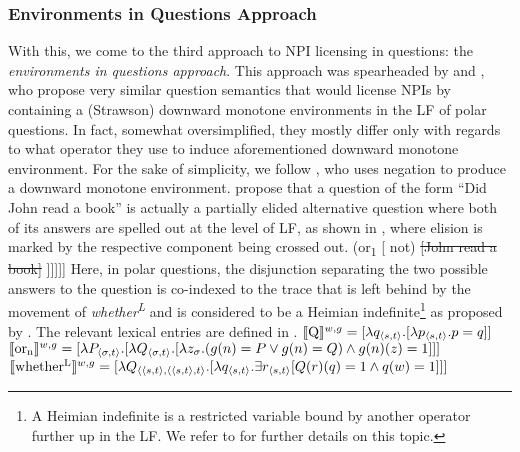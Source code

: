 \subsubsection{Environments in Questions Approach}
With this, we come to the third approach to NPI licensing in questions: the \textit{environments in questions approach}. This approach was spearheaded by \textcite{Guerzoni2014-enviro} and \textcite{Nicolae2013}, who propose very similar question semantics that would license NPIs by containing a (Strawson) downward monotone environments in the LF of polar questions. In fact, somewhat oversimplified, they mostly differ only with regards to what operator they use to induce aforementioned downward monotone environment. For the sake of simplicity, we follow \textcite{Guerzoni2014-enviro}, who uses negation to produce a downward monotone environment. \textcite{Guerzoni2014-enviro} propose that a question of the form \enquote{Did John read a book} is actually a partially elided alternative question where both of its answers are spelled out at the level of LF, as shown in , where elision is marked by the respective component being crossed out.
\ex\phantomsection
[] [whether\textsuperscript{L} [ 1 [ Q [ [John read a book] (or\textsubscript{1} [ not) \sout{[John read a book]} ]\hspace{0.5mm}]\hspace{0.5mm}]\hspace{0.5mm}]\hspace{0.5mm}]
\xe
Here, in polar questions, the disjunction separating the two possible answers to the question is co-indexed to the trace that is left behind by the movement of \textit{whether\textsuperscript{L}} and is considered to be a Heimian indefinite\footnote{A Heimian indefinite is a restricted variable bound by another operator further up in the LF. We refer to \textcite{Heim1982} for further details on this topic.} as proposed by \textcite{Rooth1982}. The relevant lexical entries are defined in .
\pex[nopreamble=true]\label{ex:gs-definitions}%
\a{} $\intension[w,g]{Q}=[\lambda{q_{\langle s,t\rangle}}.[\lambda{p_{\langle s,t\rangle}}.p=q]]$
\a{} $\intension[w,g]{or\textsubscript{n}}=[\lambda{P_{\langle\sigma,t\rangle}}.[\lambda{Q_{\langle\sigma,t\rangle}}.[\lambda{z_{\sigma}}.(g(n)=P\lor g(n)=Q)\land g(n)(z)=1]]]$
\a{} $\intension[w,g]{whether\textsuperscript{L}}=[\lambda{Q_{\langle\langle s,t\rangle,\langle\langle s,t\rangle,t\rangle}}.[\lambda{q_{\langle s,t\rangle}}.\exists{r_{\langle s,t\rangle}[Q(r)(q)=1\land q(w)=1]}]]$
